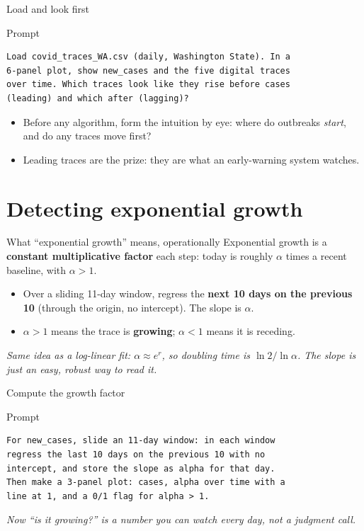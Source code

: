 \documentclass[aspectratio=169,11pt]{beamer}
\begin{document}
\begin{frame}[fragile]{Load and look first}
  \begin{block}{Prompt}
  \begin{lstlisting}
Load covid_traces_WA.csv (daily, Washington State). In a
6-panel plot, show new_cases and the five digital traces
over time. Which traces look like they rise before cases
(leading) and which after (lagging)?
  \end{lstlisting}
  \end{block}
  \begin{itemize}
    \item Before any algorithm, form the intuition by eye: where do outbreaks \emph{start},
          and do any traces move first?
    \item Leading traces are the prize: they are what an early-warning system watches.
  \end{itemize}
\end{frame}

\section{Detecting exponential growth}

\begin{frame}{What ``exponential growth'' means, operationally}
  Exponential growth is a \textbf{constant multiplicative factor} each step: today is roughly
  $\alpha$ times a recent baseline, with $\alpha > 1$.
  \begin{itemize}
    \item Over a sliding 11-day window, regress the \textbf{next 10 days on the previous 10}
          (through the origin, no intercept). The slope is $\alpha$.
    \item $\alpha > 1$ means the trace is \textbf{growing}; $\alpha < 1$ means it is
          receding.
  \end{itemize}
  \vspace{0.3em}
  \begin{center}
    \itshape Same idea as a log-linear fit: $\alpha \approx e^{r}$, so doubling time is
    $\ln 2 / \ln \alpha$. The slope is just an easy, robust way to read it.
  \end{center}
\end{frame}

\begin{frame}[fragile]{Compute the growth factor}
  \begin{block}{Prompt}
  \begin{lstlisting}
For new_cases, slide an 11-day window: in each window
regress the last 10 days on the previous 10 with no
intercept, and store the slope as alpha for that day.
Then make a 3-panel plot: cases, alpha over time with a
line at 1, and a 0/1 flag for alpha > 1.
  \end{lstlisting}
  \end{block}
  \begin{center}
    \itshape Now ``is it growing?'' is a number you can watch every day, not a judgment call.
  \end{center}
\end{frame}
\end{document}
